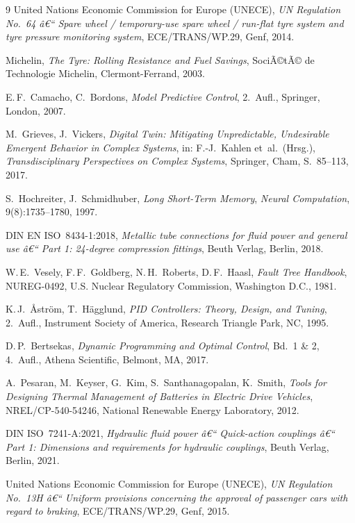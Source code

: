 ﻿\documentclass[a4paper,12pt]{article}
\theoremstyle{definition}
\begin{document}
\begin{thebibliography}{9}
United Nations Economic Commission for Europe (UNECE),
\textit{UN Regulation No.~64 â€“ Spare wheel / temporary-use spare wheel / run-flat tyre
system and tyre pressure monitoring system},
ECE/TRANS/WP.29, Genf, 2014.

Michelin,
\textit{The Tyre: Rolling Resistance and Fuel Savings},
SociÃ©tÃ© de Technologie Michelin, Clermont-Ferrand, 2003.

E.\,F.~Camacho, C.~Bordons,
\textit{Model Predictive Control},
2.~Aufl., Springer, London, 2007.

M.~Grieves, J.~Vickers,
\textit{Digital Twin: Mitigating Unpredictable, Undesirable Emergent Behavior in
Complex Systems},
in: F.-J.~Kahlen et~al.~(Hrsg.), \textit{Transdisciplinary Perspectives on
Complex Systems}, Springer, Cham, S.~85--113, 2017.

S.~Hochreiter, J.~Schmidhuber,
\textit{Long Short-Term Memory},
\textit{Neural Computation}, 9(8):1735--1780, 1997.

DIN EN ISO~8434-1:2018,
\textit{Metallic tube connections for fluid power and general use â€“ Part 1: 24-degree
compression fittings},
Beuth Verlag, Berlin, 2018.

W.\,E.~Vesely, F.\,F.~Goldberg, N.\,H.~Roberts, D.\,F.~Haasl,
\textit{Fault Tree Handbook},
NUREG-0492, U.S. Nuclear Regulatory Commission, Washington D.C., 1981.

K.\,J.~\AA{}str\"{o}m, T.~H\"{a}gglund,
\textit{PID Controllers: Theory, Design, and Tuning},
2.~Aufl., Instrument Society of America, Research Triangle Park, NC, 1995.

D.\,P.~Bertsekas,
\textit{Dynamic Programming and Optimal Control}, Bd.~1 \& 2,
4.~Aufl., Athena Scientific, Belmont, MA, 2017.

A.~Pesaran, M.~Keyser, G.~Kim, S.~Santhanagopalan, K.~Smith,
\textit{Tools for Designing Thermal Management of Batteries in Electric Drive Vehicles},
NREL/CP-540-54246, National Renewable Energy Laboratory, 2012.

DIN ISO~7241-A:2021,
\textit{Hydraulic fluid power â€“ Quick-action couplings â€“ Part 1: Dimensions and
requirements for hydraulic couplings},
Beuth Verlag, Berlin, 2021.

United Nations Economic Commission for Europe (UNECE),
\textit{UN Regulation No.~13H â€“ Uniform provisions concerning the approval of passenger
cars with regard to braking},
ECE/TRANS/WP.29, Genf, 2015.


\end{thebibliography}
\end{document}
